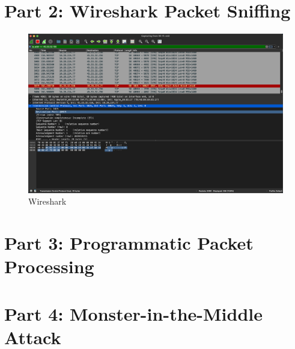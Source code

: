 \documentclass[onecolumn,oneside]{BUPTHomework}
\begin{document}
  \section*{Part 2: Wireshark Packet Sniffing}

  \begin{figure}[h]
    \centering
    \includegraphics[width=1.00\textwidth]{img/fig6.png}
    \caption{Wireshark}
    \label{fig6}
  \end{figure}

  \section*{Part 3: Programmatic Packet Processing}

  \section*{Part 4: Monster-in-the-Middle Attack}
\end{document}
